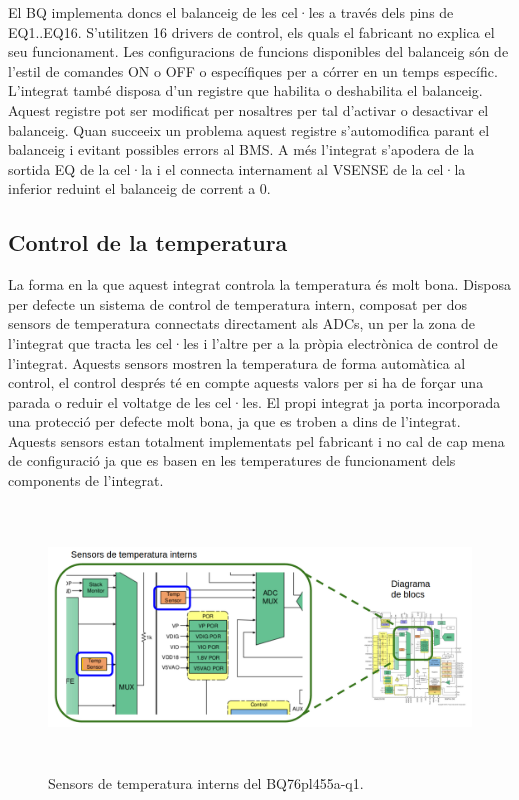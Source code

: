  El BQ implementa doncs el balanceig de les cel·les a través dels pins de EQ1..EQ16. S'utilitzen 16 drivers de control, els quals el fabricant no explica el seu funcionament. Les configuracions de funcions disponibles del balanceig són de l'estil de comandes ON o OFF o específiques per a córrer en un temps específic. L'integrat també disposa d'un registre que habilita o deshabilita el balanceig. Aquest registre pot ser modificat per nosaltres per tal d'activar o desactivar el balanceig. Quan succeeix un problema aquest registre s'automodifica parant el balanceig i evitant possibles errors al BMS. A més l'integrat s'apodera de la sortida EQ de la cel·la i el connecta internament al VSENSE de la cel·la inferior reduint el balanceig de corrent a 0.

\subsection{Control de la temperatura}

La forma en la que aquest integrat controla la temperatura és molt bona. Disposa per defecte un sistema de control de temperatura intern, composat per dos sensors de temperatura connectats directament als ADCs, un per la zona de l'integrat que tracta les cel·les i l'altre per a la pròpia electrònica de control de l'integrat. Aquests sensors mostren la temperatura de forma automàtica al control, el control després té en compte aquests valors per si ha de forçar una parada o reduir el voltatge de les cel·les. El propi integrat ja porta incorporada una protecció per defecte molt bona, ja que es troben a dins de l'integrat. Aquests sensors estan totalment implementats pel fabricant i no cal de cap mena de configuració ja que es basen en les temperatures de funcionament dels components de l'integrat. 

\begin{figure}[H]
	\centering
    \includegraphics[width=\textwidth, height=7cm] {Prototip/sensorestemperaturainternos.png}
    \caption{Sensors de temperatura interns del BQ76pl455a-q1.}
\end{figure}

